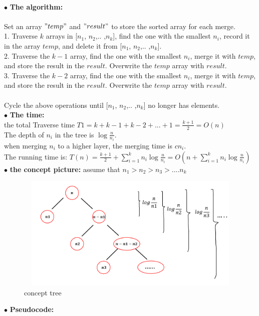 \documentclass[12pt,a4paper]{article}
\newcommand{\question}[1]{\bigskip\noindent{\textbf{Q{#1} solution}}}
\begin{document}
\question{14.C}\\
$\bullet$ \textbf{The algorithm:}\\\\
Set an array $"temp"$ and $"result"$ to store the sorted array for each merge.\\
1. Traverse $k$ arrays in [$n_1$, $n_2$,.. ,$n_k$], find the one with the smallest $n_i$, record it in the array $temp$, and delete it from [$n_1$, $n_2$,.. ,$n_k$].\\
2. Traverse the $k-1$ array, find the one with the smallest $n_i$, merge it with $temp$, and store the result in the $result$. Overwrite the $temp$ array with $result$.\\
3. Traverse the $k-2$ array, find the one with the smallest $n_i$, merge it with $temp$, and store the result in the $result$. Overwrite the $temp$ array with $result$.\\\\
Cycle the above operations until [$n_1$, $n_2$,.. ,$n_k$] no longer has elements.\\
$\bullet$ \textbf{The time:}\\
the total Traverse time $T1 = k+k-1+k-2+...+1 = \frac{k+1}{2} = O(n)$\\
The depth of $n_i$ in the tree is $\log{\frac{n}{n_i}}$.\\
when merging $n_i$ to a higher layer, the merging time is $cn_i$.\\
The running time is: $T(n) = \frac{k+1}{2}+ \sum^k_{i=1}{n_i\log{\frac{n}{n_i}}} = O(n+\sum^k_{i=1}{n_i\log{\frac{n}{n_i}}})$\\
$\bullet$ \textbf{the concept picture:} assume that $n_1>n_2>n_3>$....$n_k$\\
	\begin{figure}[H]
	\centering %
	\includegraphics[height=5.5cm,width=12.5cm]{picture//Q14C2.png}
	\caption{concept tree}
	\end{figure}
$\bullet$ \textbf{Pseudocode:}
\end{document}
